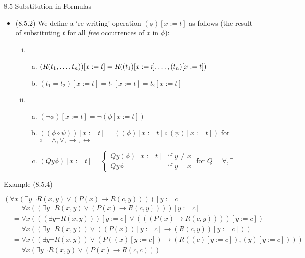 \begin{frame}{8.5 Substitution in Formulas}
	
	\begin{itemize}%
	\itemsep=16pt
	
			\item (8.5.2)  We define a `re-writing' operation $(\phi)[x:=t]$ as follows (the result of substituting $t$ for all \emph{free} occurrences of $x$ in $\phi$):
	
		
		\medskip	
		
		\begin{enumerate}[(i)]
		\itemsep=10pt
	
			\item \begin{enumerate}[(a)] 
			
				\item $(R(t_1, \mathellipsis, t_n))[x:=t]=R((t_1)[x:=t], \mathellipsis, (t_n)[x:=t])$
				
				\item $(t_1=t_2)[x:=t]=t_1[x:=t]=t_2[x:=t]$
				
			\end{enumerate}
			
			\item \begin{enumerate}[(a)] 

			\item $(\neg\phi)[x:=t]=\neg(\phi[x:=t])$

			
			\item $((\phi\circ\psi))[x:=t]=((\phi)[x:=t]\circ(\psi)[x:=t])$ for $\circ=\land,\lor,\to,\leftrightarrow$
			
			\item $(Qy\phi)[x:=t]=\begin{cases} Qy(\phi)[x:=t] & \text{if } y\neq x\\ Qy\phi & \text{if }y=x\end{cases}$ for $Q=\forall,\exists$

			\end{enumerate}
	

			\end{enumerate}
	
	\end{itemize}

\end{frame}

\begin{frame}{Example (8.5.4)}

$(\forall x(\exists y \neg R(x,y)\lor (P(x)\to R(c,y))))[y:=c]$
	\begin{align*}
	&=\forall x((\exists y \neg R(x,y)\lor (P(x)\to R(c,y))))[y:=c]\\
	&=\forall x(((\exists y \neg R(x,y)))[y:=c]\lor (((P(x)\to R(c,y))))[y:=c])\\
	&=\forall x((\exists y \neg R(x,y))\lor ((P(x))[y:=c]\to (R(c,y))[y:=c]))\\
	&=\forall x((\exists y \neg R(x,y))\lor (P((x)[y:=c])\to (R((c)[y:=c]), (y)[y:=c])))\\
	&=\forall x(\exists y \neg R(x,y)\lor (P(x)\to R(c,c)))
	\end{align*}

\end{frame}


